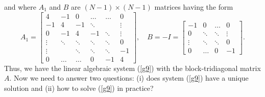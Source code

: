 and where $A_{1}$ and $B$ are $(N-1)\times(N-1)$ matrices having the form
\begin{equation}
A_{1}=\left[
\begin{array}{cccccc}
4 &-1  &0      &\dots  &\dots &0 \\
-1 &4  &-1     &\ddots  &     &\vdots \\
0  &-1 &4      &-1      &\ddots &\vdots \\
\vdots &\ddots &\ddots &\ddots &\ddots &0 \\
\vdots &       &\ddots &\ddots &\ddots &-1 \\
0      &\dots  &\dots  &0      &-1 &4
\end{array}\right], \quad
B=-I=\left[
\begin{array}{cccc}
-1  &0      &\dots  &0 \\
0   &\ddots  &\ddots  &\vdots \\
\vdots  &\ddots  &\ddots  &0 \\
0     &\dots &0  &-1
\end{array}\right]. \label{g11}
\end{equation}
Thus, we have the linear algebraic system (\ref{g9}) with
the block-tridiagonal matrix $A$. Now we need
to answer two questions: (i) does system (\ref{g9}) have a unique solution and (ii) how to solve
(\ref{g9}) in practice?



\vskip 0.5cm
 
